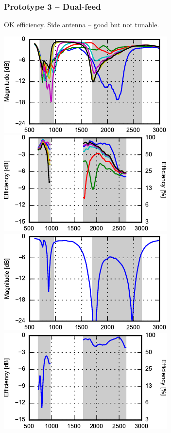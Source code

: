 \begin{frame}
    \frametitle{Prototype 3 -- Dual-feed}
    OK efficiency. Side antenna -- good but not tunable.
    \begin{center}
        \includegraphics{img/soren/proto/design3hv/s11.pdf}
        \includegraphics{img/soren/proto/design3hv/efftop.pdf}\\
        \includegraphics{img/soren/proto/design3hv/s22.pdf}
        \includegraphics{img/soren/proto/design3hv/effside.pdf}
    \end{center}
    \legendfooter
\end{frame}

